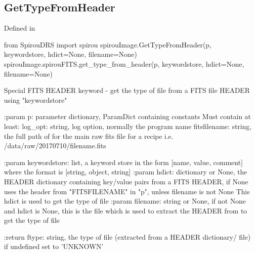 \begin{minipage}{\textwidth}
\subsection{GetTypeFromHeader}

Defined in \spirouImage{}

\begin{pythonbox}
from SpirouDRS import spirou
spirouImage.GetTypeFromHeader(p, keywordstore, hdict=None, filename=None)
spirouImage.spirouFITS.get_type_from_header(p, keywordstore, hdict=None, filename=None)
\end{pythonbox}

\begin{pythondocstring}
Special FITS HEADER keyword - get the type of file from a FITS file HEADER
using "keywordstore"

:param p: parameter dictionary, ParamDict containing constants
    Must contain at least:
            log_opt: string, log option, normally the program name
            fitsfilename: string, the full path of for the main raw fits
                          file for a recipe
                          i.e. /data/raw/20170710/filename.fits

:param keywordstore: list, a keyword store in the form
                     [name, value, comment] where the format is
                     [string, object, string]
:param hdict: dictionary or None, the HEADER dictionary containing
              key/value pairs from a FITS HEADER, if None uses the
              header from "FITSFILENAME" in "p", unless filename is not None
              This hdict is used to get the type of file
:param filename: string or None, if not None and hdict is None, this is the
                 file which is used to extract the HEADER from to get
                 the type of file

:return ftype: string, the type of file (extracted from a HEADER dictionary/
               file) if undefined set to 'UNKNOWN'
\end{pythondocstring}
\end{minipage}


